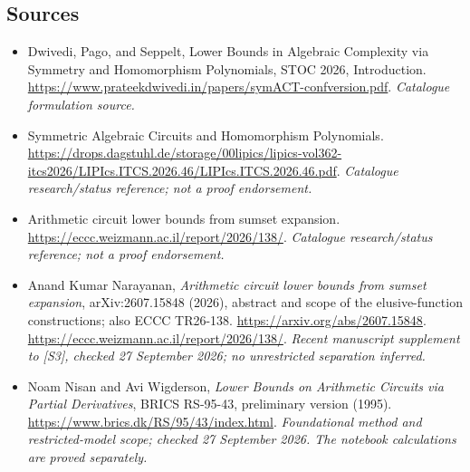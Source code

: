 \documentclass[11pt,a4paper]{article}
\numberwithin{equation}{section}
\begin{document}
\subsection{Sources}
\begin{itemize}\raggedright
\item[\textnormal{[S1]}]\hypertarget{source:32:1}{} Dwivedi, Pago, and Seppelt, Lower Bounds in Algebraic Complexity via Symmetry and Homomorphism Polynomials, STOC 2026, Introduction.
\url{https://www.prateekdwivedi.in/papers/symACT-confversion.pdf}.
{\small\textit{Catalogue formulation source.}}
\item[\textnormal{[S2]}]\hypertarget{source:32:2}{} Symmetric Algebraic Circuits and Homomorphism Polynomials.
\url{https://drops.dagstuhl.de/storage/00lipics/lipics-vol362-itcs2026/LIPIcs.ITCS.2026.46/LIPIcs.ITCS.2026.46.pdf}.
{\small\textit{Catalogue research/status reference; not a proof endorsement.}}
\item[\textnormal{[S3]}]\hypertarget{source:32:3}{} Arithmetic circuit lower bounds from sumset expansion.
\url{https://eccc.weizmann.ac.il/report/2026/138/}.
{\small\textit{Catalogue research/status reference; not a proof endorsement.}}
\item[\textnormal{[E1]}]\hypertarget{extra:32:1}{} Anand Kumar Narayanan,
\emph{Arithmetic circuit lower bounds from sumset expansion},
arXiv:2607.15848 (2026), abstract and scope of the elusive-function
constructions; also ECCC TR26-138.
\url{https://arxiv.org/abs/2607.15848}.
\url{https://eccc.weizmann.ac.il/report/2026/138/}.
{\small\textit{Recent manuscript supplement to [S3], checked
27 September 2026; no unrestricted separation inferred.}}
\item[\textnormal{[E2]}]\hypertarget{extra:32:2}{} Noam Nisan and
Avi Wigderson, \emph{Lower Bounds on Arithmetic Circuits via Partial
Derivatives}, BRICS RS-95-43, preliminary version (1995).
\url{https://www.brics.dk/RS/95/43/index.html}.
{\small\textit{Foundational method and restricted-model scope; checked
27 September 2026. The notebook calculations are proved separately.}}

\end{itemize}

\end{document}
